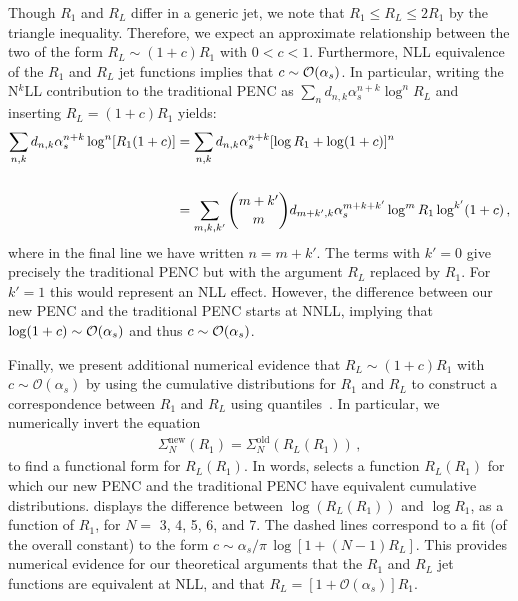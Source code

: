 Though \(R_1\) and \(R_L\) differ in a generic jet, we note that $R_1 \leq R_L \leq 2R_1$ by the triangle inequality.
%
Therefore, we expect an approximate relationship between the two of the form $R_L \sim (1+c) R_1$ with $0<c<1$.
%
Furthermore, NLL equivalence of the \(R_1\) and \(R_L\) jet functions implies that  $c \sim {\cal O}(\alpha_s)$.
%
In particular,
writing the N\(^k\)LL contribution to the traditional PENC as $\sum_{n} d_{n,k}\alpha_s^{n+k}\log^n R_L$
and inserting $R_L = (1+c) R_1$ yields:
\begin{align}
    \label{eq:c_is_alphas}
   \sum_{n,k}
       d_{n,k} \alpha_s^{n+k}
       \log^n[
           R_1
           (1 +
           c)
       ]
   &=
   \sum_{n,k}
      d_{n,k} \alpha_s^{n+k}[\log R_1 +\log(1+c)]^n
  \nn \\
   &=
   \sum_{m,k,k'}
      {m+k' \choose m}
      d_{m+k', k} \alpha_s^{m+k+k'} \log^m R_1 \log^{k'} (1+c)
      \,,
\end{align}
where in the final line we have written \(n = m + k'\).
%
The terms with \(k' = 0\) give precisely the traditional PENC but with the argument \(R_L\) replaced by \(R_1\).
%
For \(k' = 1\) this would represent an NLL effect. However, the difference between our new PENC and the traditional PENC starts at NNLL, implying that $\log(1+c) \sim {\cal O}(\alpha_s)$ and thus $c \sim {\cal O}(\alpha_s)$.


Finally, we present additional numerical evidence that \(R_L \sim \left(1+c\right)R_1\) with \(c \sim \mathcal{O}(\alpha_s)\) by using the cumulative distributions for \(R_1\) and \(R_L\) to construct a correspondence between $R_1$ and $R_L$ using quantiles~\cite{Brewer:2018dfs}.
%
In particular, we numerically invert the equation
\begin{align}
   \label{eq:quantiles}
   \Sigma^\text{new}_{N}(R_1)
   =
   \Sigma^\text{old}_N(
       R_L
       (R_1)
   )
   \, ,
\end{align}
to find a functional form for \(R_L(R_1)\).
%
In words,  selects a function \(R_L(R_1)\) for which our new PENC and the traditional PENC have equivalent cumulative distributions.
%
 displays the difference between $\log(R_L(R_1))$ and $\log R_1$, as a function of $R_1$, for $N=$ 3, 4, 5, 6, and 7.
%
The dashed lines correspond to a fit (of the overall constant) to the form $c \sim \alpha_s/\pi\, \log[1+(N-1) R_L]$.
%
This provides numerical evidence for our theoretical arguments that the \(R_1\) and \(R_L\) jet functions are equivalent at NLL, and that $R_L = [1 + {\mathcal O}(\alpha_s)] R_1$.


